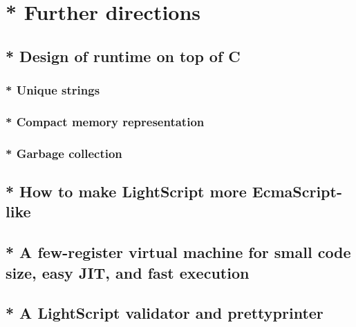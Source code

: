 \chapter{* Further directions}
\section{* Design of runtime on top of C}
\subsection{* Unique strings}
\subsection{* Compact memory representation}
\subsection{* Garbage collection}
\section{* How to make LightScript more EcmaScript-like}
\section{* A few-register virtual machine for small code size, easy JIT, and fast execution}
\section{* A LightScript validator and prettyprinter}
